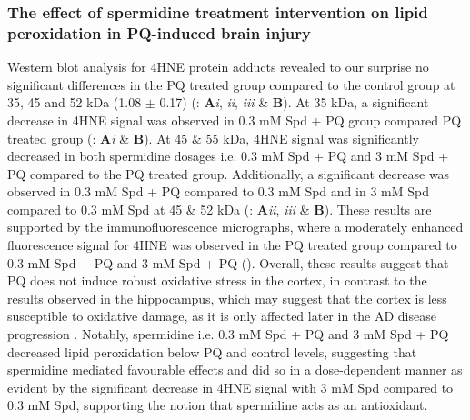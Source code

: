 \subsubsection{The effect of spermidine treatment intervention on lipid peroxidation in PQ-induced brain injury}
Western blot analysis for 4HNE protein adducts revealed to our surprise no significant differences in the PQ treated group compared to the control group at 35, 45 and 52 kDa (1.08 $\pm$ 0.17) (: \textbf{A}\textit{i}, \textit{ii}, \textit{iii} \& \textbf{B}). At 35 kDa, a significant decrease in 4HNE signal was observed in 0.3 mM Spd + PQ group compared PQ treated group (: \textbf{A}\textit{i} \& \textbf{B}). At 45 \& 55 kDa, 4HNE signal was significantly decreased in both spermidine dosages i.e. 0.3 mM Spd + PQ and 3 mM Spd + PQ compared to the PQ treated group. Additionally, a significant decrease was observed in 0.3 mM Spd + PQ compared to 0.3 mM Spd and in 3 mM Spd compared to 0.3 mM Spd at 45 \& 52 kDa (: \textbf{A}\textit{ii}, \textit{iii} \& \textbf{B}). These results are supported by the immunofluorescence micrographs, where a moderately enhanced fluorescence signal for 4HNE was observed in the PQ treated group compared to 0.3 mM Spd + PQ and 3 mM Spd + PQ (). Overall, these results suggest that PQ does not induce robust oxidative stress in the cortex, in contrast to the results observed in the hippocampus, which may suggest that the cortex is less susceptible to oxidative damage, as it is only affected later in the AD disease progression \citep{lumkwana2017}. Notably, spermidine i.e. 0.3 mM Spd + PQ and 3 mM Spd + PQ decreased lipid peroxidation below PQ and control levels, suggesting that spermidine mediated favourable effects and did so in a dose-dependent manner as evident by the significant decrease in 4HNE signal with 3 mM Spd compared to 0.3 mM Spd, supporting the notion that spermidine acts as an antioxidant.

